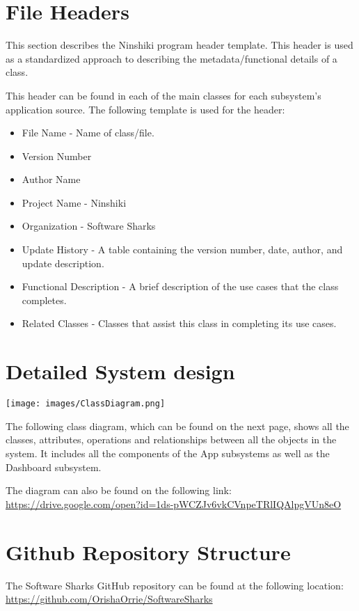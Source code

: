 \documentclass[a4paper, 11pt]{article}
\begin{document}
\section{File Headers}
This section describes the Ninshiki program header template. This header is used as a standardized approach to describing the metadata/functional details of a class.

This header can be found in each of the main classes for each subsystem’s application source.
The following template is used for the header:
\begin{itemize}
\item File Name - Name of class/file.
\item Version Number
\item Author Name
\item Project Name - Ninshiki
\item Organization - Software Sharks
\item Update History - A table containing the version number, date, author, and update description.
\item Functional Description - A brief description of the use cases that the class completes.
\item Related Classes - Classes that assist this class in completing its use cases.
\end{itemize}
\pagebreak

\section{Detailed System design}
\begin{sidewaysfigure}
    \texttt{[image: images/ClassDiagram.png]}
\end{sidewaysfigure}
The following class diagram, which can be found on the next page, shows all the classes, attributes, operations and relationships between all the objects in the system.
It includes all the components of the App subsystems as well as the Dashboard subsystem.

The diagram can also be found on the following link: \linebreak
\linebreak
\url{https://drive.google.com/open?id=1ds-pWCZJv6vkCVnpeTRlIQAlpgVUn8eO}

\pagebreak

\section{Github Repository Structure}
The Software Sharks GitHub repository can be found at the following location:
\url{https://github.com/OrishaOrrie/SoftwareSharks}
\end{document}

